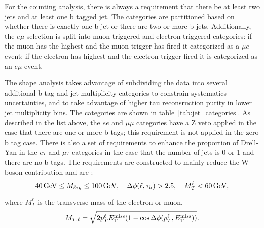 For the counting analysis, there is always a requirement that there be at least two jets and at least one b tagged jet. The categories are partitioned based on whether there is exactly one b jet or there are two or more b jets.  Additionally, the $e\mu$ selection is split into muon triggered and electron triggered categories: if the muon has the highest \pt and the muon trigger has fired it categorized as a $\mu e$ event; if the electron has highest \pt and the electron trigger fired it is categorized as an $e \mu$ event.

The shape analysis takes advantage of subdividing the data into several additional b tag and jet multiplicity categories to constrain systematics uncertainties, and to take advantage of higher tau reconsruction purity in lower jet multiplicity bins.  The categories are shown in table~\ref{tab:jet_categories}.  As described in the list above, the $ee$ and $\mu\mu$ categories have a Z veto applied in the case that there are one or more b tags; this requirement is not applied in the zero b tag case.  There is also a set of requirements to enhance the proportion of Drell-Yan in the $e\tau$ and $\mu\tau$ categories in the case that the number of jets is 0 or 1 and there are no b tags.  The requirements are constructed to mainly reduce the W boson contribution and are :
\begin{equation*}
    40 \,\text{Ge\hspace{-.08em}V} \leq M_{\ell\tau_{h}} \leq 100 \,\text{Ge\hspace{-.08em}V}, \quad
    \Delta\phi(\ell, \tau_{h}) > 2.5, \quad
    M_{T}^{\ell} < 60 \,\text{Ge\hspace{-.08em}V},
\end{equation*}

\noindent where $M_{T}^{\ell}$ is the transverse mass of the electron or muon,
\begin{equation}
\label{eq:trans_mass}
    M_{T,\ell} = \sqrt{2 p_{T}^{\ell}E_{\mathrm{T}}^{\text{miss}} (1-\cos\Delta\phi(p_{T}^{\ell}, E_{\mathrm{T}}^{\text{miss}}))}.
\end{equation}




% 




